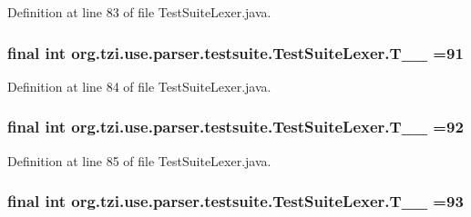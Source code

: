 Definition at line 83 of file Test\-Suite\-Lexer.\-java.

\hypertarget{classorg_1_1tzi_1_1use_1_1parser_1_1testsuite_1_1_test_suite_lexer_a186a678354200766ffea5f1824af8d0d}{
\subsubsection[{T\-\_\-\-\_\-91}]{\setlength{\rightskip}{0pt plus 5cm}final int org.\-tzi.\-use.\-parser.\-testsuite.\-Test\-Suite\-Lexer.\-T\-\_\-\-\_ =91\hspace{0.3cm}{\ttfamily [static]}}}\label{classorg_1_1tzi_1_1use_1_1parser_1_1testsuite_1_1_test_suite_lexer_a186a678354200766ffea5f1824af8d0d}


Definition at line 84 of file Test\-Suite\-Lexer.\-java.

\hypertarget{classorg_1_1tzi_1_1use_1_1parser_1_1testsuite_1_1_test_suite_lexer_ac74121523d2807836be0e46e3b0871d1}{
\subsubsection[{T\-\_\-\-\_\-92}]{\setlength{\rightskip}{0pt plus 5cm}final int org.\-tzi.\-use.\-parser.\-testsuite.\-Test\-Suite\-Lexer.\-T\-\_\-\-\_ =92\hspace{0.3cm}{\ttfamily [static]}}}\label{classorg_1_1tzi_1_1use_1_1parser_1_1testsuite_1_1_test_suite_lexer_ac74121523d2807836be0e46e3b0871d1}


Definition at line 85 of file Test\-Suite\-Lexer.\-java.

\hypertarget{classorg_1_1tzi_1_1use_1_1parser_1_1testsuite_1_1_test_suite_lexer_a0319f3b79f4594992d08ce2d3422a821}{
\subsubsection[{T\-\_\-\-\_\-93}]{\setlength{\rightskip}{0pt plus 5cm}final int org.\-tzi.\-use.\-parser.\-testsuite.\-Test\-Suite\-Lexer.\-T\-\_\-\-\_ =93\hspace{0.3cm}{\ttfamily [static]}}}\label{classorg_1_1tzi_1_1use_1_1parser_1_1testsuite_1_1_test_suite_lexer_a0319f3b79f4594992d08ce2d3422a821}


